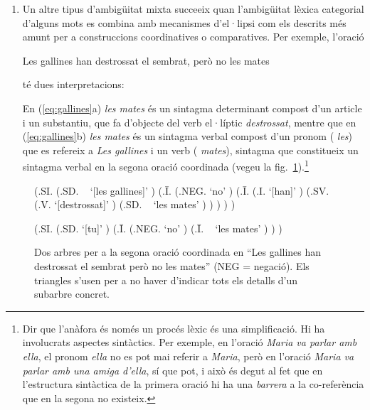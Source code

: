 \begin{enumerate}
  \item Un altre tipus d'ambigüitat mixta succeeix quan l'ambigüitat
    lèxica categorial d'alguns mots es combina amb mecanismes
    d'el·lipsi com els descrits més amunt per a construccions
    coordinatives o comparatives.  Per exemple, l'oració
    \begin{exemple}
    Les gallines han destrossat el sembrat, però no les
        mates
    \end{exemple}
    té dues interpretacions:
    En (\ref{eq:gallines}a) \emph{les mates} és un sintagma
    determinant compost d'un article i un substantiu, que fa d'objecte del
    verb el·líptic \emph{destrossat}, mentre que en (\ref{eq:gallines}b)
    \emph{les mates} és un sintagma verbal compost d'un pronom ({\em
      les}) que es refereix a \emph{Les gallines} i un verb ({\em
      mates}), sintagma que constitueix un sintagma verbal en la
    segona oració coordinada (vegeu la fig.~\ref{fg:mates}).\footnote{Dir que l'anàfora és només un procés lèxic és una simplificació. Hi ha involucrats aspectes sintàctics. Per exemple, en l'oració \emph{Maria va parlar amb ella}, el pronom \emph{ella} no es pot mai referir a \emph{Maria}, però en l'oració \emph{Maria va parlar amb una amiga d'ella}, sí que pot, i això és degut al fet que en l'estructura sintàctica de la primera oració hi ha una \emph{barrera} a la co-referència que en la segona no existeix.}
\end{enumerate}

\begin{figure}
\begin{center}
\begin{parsetree}
(.SI. (.SD. ~ `[les gallines]' ) (.{\={I}}. (.NEG. `no' )
(.{\={I}}. (.I. `[han]' ) (.SV. (.V. `[destrossat]' )  (.SD. ~ `les
mates' ) ) ) ) ) 
\end{parsetree}
\end{center}
\begin{center}
\begin{parsetree}
(.SI. (.SD. `[tu]' ) (.{\={I}}. (.NEG. `no' ) (.{\={I}}. ~ `les mates'
) ) )
\end{parsetree}
\end{center}
\caption{Dos arbres per a la segona oració coordinada en ``Les
  gallines han destrossat el sembrat però no les mates'' (NEG =
  negació). Els triangles s'usen per a no haver d'indicar tots els detalls d'un subarbre concret.}
\label{fg:mates}
\end{figure}




